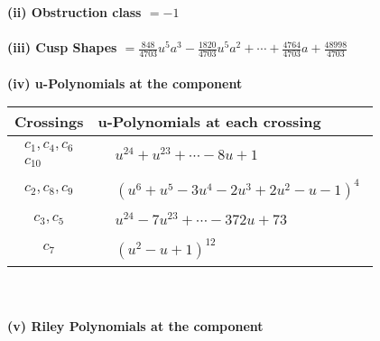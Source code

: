 \documentclass[1p]{elsarticle_modified}
\theoremstyle{definition}
\begin{document}
\flushleft \textbf{(ii) Obstruction class $= -1$}\\~\\
\flushleft \textbf{(iii) Cusp Shapes $= \frac{848}{4703} u^5 a^3-\frac{1820}{4703} u^5 a^2+\cdots+\frac{4764}{4703} a+\frac{48998}{4703}$}\\~\\
\newpage\renewcommand{\arraystretch}{1}
\flushleft \textbf{(iv) u-Polynomials at the component}\newline \\
\begin{tabular}{m{50pt}|m{274pt}}
Crossings & \hspace{64pt}u-Polynomials at each crossing \\
\hline $$\begin{aligned}c_{1},c_{4},c_{6}\\c_{10}\end{aligned}$$&$\begin{aligned}
&u^{24}+u^{23}+\cdots-8 u+1
\end{aligned}$\\
\hline $$\begin{aligned}c_{2},c_{8},c_{9}\end{aligned}$$&$\begin{aligned}
&(u^6+u^5-3 u^4-2 u^3+2 u^2- u-1)^4
\end{aligned}$\\
\hline $$\begin{aligned}c_{3},c_{5}\end{aligned}$$&$\begin{aligned}
&u^{24}-7 u^{23}+\cdots-372 u+73
\end{aligned}$\\
\hline $$\begin{aligned}c_{7}\end{aligned}$$&$\begin{aligned}
&(u^2- u+1)^{12}
\end{aligned}$\\
\hline
\end{tabular}\\~\\
\newpage\renewcommand{\arraystretch}{1}
\flushleft \textbf{(v) Riley Polynomials at the component}\newline \\
\end{document}
